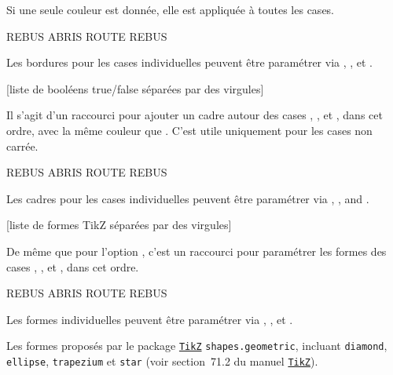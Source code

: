 \documentclass[svgnames]{report}
\newcommand\ctan[1]{\href{https://www.ctan.org/pkg/#1}{\texttt{#1}}}
\begin{document}
  Si une seule couleur est donnée, elle est appliquée à toutes les cases.

  \begin{example}
  \begin{wordle}[CouleurBordures={red,orange,blue}]{REBUS}
    ABRIS
    ROUTE
    REBUS
  \end{wordle}
  \end{example}

  Les bordures pour les cases individuelles peuvent être paramétrer via
  , ,  et .

  [liste de booléens true/false séparées par des virgules]

  Il s'agit d'un raccourci pour ajouter un cadre autour des cases , ,  et , dans cet ordre, avec la même couleur que . C'est utile uniquement pour les cases non carrée.

  \begin{example}
  \begin{wordle}[Cadres={false,true,true},Formes=circle]{REBUS}
    ABRIS
    ROUTE
    REBUS
  \end{wordle}
  \end{example}

  Les cadres pour les cases individuelles peuvent être paramétrer via , ,
   and .

  [liste de formes TikZ séparées par des virgules]

  De même que pour l'option , c'est un raccourci pour paramétrer les formes des cases , ,
   et , dans cet ordre.

  \begin{example}
  \begin{wordle}[Formes={circle, rectangle, circle}]{REBUS}
    ABRIS
    ROUTE
    REBUS
  \end{wordle}
  \end{example}

  Les formes individuelles peuvent être paramétrer via , ,
   et .

  Les formes proposés par le package \ctan{TikZ}
  \texttt{shapes.geometric}, incluant \texttt{diamond},
  \texttt{ellipse}, \texttt{trapezium} et \texttt{star} (voir section~71.2 du manuel \ctan{TikZ}).
\end{document}
